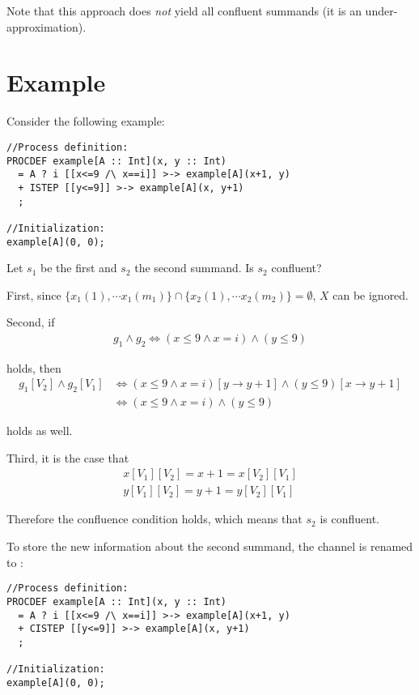 Note that this approach does \emph{not} yield all confluent \istep{} summands (it is an under-approximation).

\section{Example}

Consider the following example:

\begin{lstlisting}
//Process definition:
PROCDEF example[A :: Int](x, y :: Int)
  = A ? i [[x<=9 /\ x==i]] >-> example[A](x+1, y)
  + ISTEP [[y<=9]] >-> example[A](x, y+1)
  ;

//Initialization:
example[A](0, 0);
\end{lstlisting}

Let $s_1$ be the first and $s_2$ the second summand.
Is $s_2$ confluent?

First, since $\{ x_1(1), \cdots{} x_1(m_1) \} \cap \{ x_2(1), \cdots{} x_2(m_2) \} = \emptyset{}$, $X$ can be ignored.

Second, if
\begin{align*}
g_1 \land g_2 \Leftrightarrow (x \leq 9 \land x=i) \land (y \leq 9)
\end{align*}

holds, then
\begin{align*}
g_1[V_2] \land g_2[V_1] &\Leftrightarrow (x \leq 9 \land x=i)[ y \rightarrow y+1 ] \land (y \leq 9)[ x \rightarrow y+1 ] \\
&\Leftrightarrow (x \leq 9 \land x=i) \land (y \leq 9)
\end{align*}

holds as well.

Third, it is the case that
\begin{align*}
x[V_1][V_2] = x+1 = x[V_2][V_1] \\
y[V_1][V_2] = y+1 = y[V_2][V_1]
\end{align*}

Therefore the confluence condition holds, which means that $s_2$ is confluent.

To store the new information about the second summand, the channel is renamed to \cistep{}:

\begin{lstlisting}
//Process definition:
PROCDEF example[A :: Int](x, y :: Int)
  = A ? i [[x<=9 /\ x==i]] >-> example[A](x+1, y)
  + CISTEP [[y<=9]] >-> example[A](x, y+1)
  ;

//Initialization:
example[A](0, 0);
\end{lstlisting}

